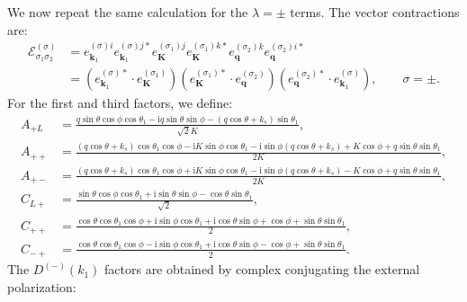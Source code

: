 \documentclass[a4paper,12pt]{article}
\def\mb{\mathbf}
\def\ii{\mathrm{i}}
\def\si{\sigma}
\begin{document}
We now repeat the same calculation for the $\lambda=\pm$ terms.
The vector contractions are:
\begin{align}
    \mathcal{E}^{(\sigma)}_{\si_1\si_2}
    &=
    e^{(\sigma)i}_{\mb k_1} e^{(\sigma)j*}_{\mb k_1}
    e^{(\si_1)j}_{\mb K}e^{(\si_1)k*}_{\mb K}
    e^{(\si_2)k}_{\mb q}e^{(\si_2)i*}_{\mb q} \nonumber \\
    &=
    (e^{(\sigma)*}_{\mb k_1}\cdot e^{(\si_1)}_{\mb K})
    (e^{(\si_1)*}_{\mb K}\cdot e^{(\si_2)}_{\mb q})
    (e^{(\si_2)*}_{\mb q}\cdot e^{(\sigma)}_{\mb k_1}),
    \qquad \sigma=\pm.
\end{align}
For the first and third factors, we define:
\begin{align}
    A_{+L}
    &=\frac{q\sin\theta\cos\phi\cos\theta_1-\ii q\sin\theta\sin\phi-(q\cos\theta+k_s)\sin\theta_1}{\sqrt{2}K}, \\
    A_{++}
    &=\frac{(q\cos\theta+k_s)\cos\theta_1\cos\phi
    - \ii K \sin\phi\cos\theta_1
    - \ii \sin\phi (q\cos\theta+k_s)
    + K \cos\phi
    + q \sin\theta\sin\theta_1}
    {2K}, \nonumber \\
    A_{+-}
    &=\frac{(q\cos\theta+k_s)\cos\theta_1\cos\phi
    + \ii K \sin\phi\cos\theta_1
    - \ii \sin\phi (q\cos\theta+k_s)
    - K \cos\phi
    + q \sin\theta\sin\theta_1}
    {2K}, \nonumber \\
    C_{L+}
    &=\frac{\sin\theta\cos\phi\cos\theta_1
    +\ii\sin\theta\sin\phi
    -\cos\theta\sin\theta_1}
    {\sqrt{2}}, \nonumber \\
    C_{++}
    &=\frac{\cos\theta\cos\theta_1\cos\phi
    + \ii \sin\phi \cos\theta_1
    + \ii \cos\theta\sin\phi
    + \cos\phi
    + \sin\theta\sin\theta_1}
    {2}, \nonumber \\
    C_{-+}
    &=\frac{\cos\theta\cos\theta_1\cos\phi
    - \ii \sin\phi \cos\theta_1
    + \ii \cos\theta\sin\phi
    - \cos\phi
    + \sin\theta\sin\theta_1}
    {2}. 
\end{align}
The $D^{(-)}(k_1)$ factors are obtained by complex conjugating the external polarization:
\end{document}
